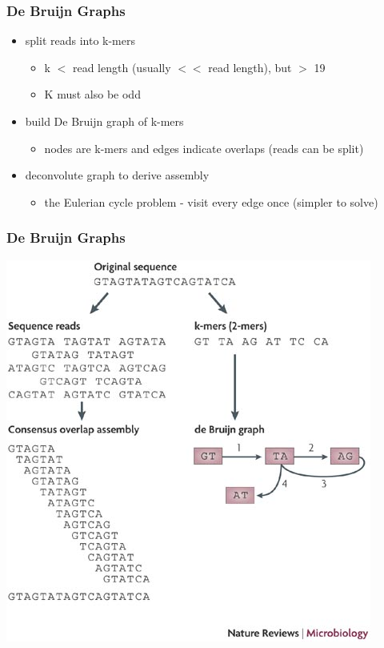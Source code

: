 \documentclass[pdf]{beamer}
\begin{document}
\begin{frame}
\frametitle{De Bruijn Graphs}
\begin{itemize}
\item split reads into k-mers
\begin{itemize}
\item k $<$ read length (usually $<<$ read length), but $>$ 19
\item K must also be odd
\end{itemize}
\item build De Bruijn graph of k-mers
\begin{itemize}
\item nodes are k-mers and edges indicate overlaps (reads can be split)
\end{itemize}
\item deconvolute graph to derive assembly
\begin{itemize}
\item the Eulerian cycle problem - visit every edge once (simpler to solve)
\end{itemize}
\end{itemize}

\end{frame}

\begin{frame}
\frametitle{De Bruijn Graphs}
\begin{center}
\includegraphics[scale=0.45]{Figures/smallEx.jpg} 
\end{center}
\end{frame}
\end{document}
